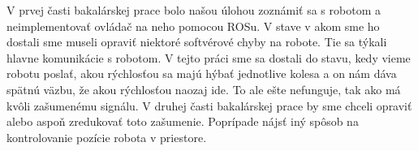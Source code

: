 
V prvej časti bakalárskej prace bolo našou úlohou zoznámiť sa s robotom a neimplementovať ovládač na neho pomocou ROSu.
V stave v akom sme ho dostali sme museli opraviť niektoré softvérové chyby na robote. Tie sa týkali hlavne komunikácie s robotom.
V tejto práci sme sa dostali do stavu, kedy vieme robotu poslať, akou rýchlosťou sa majú hýbať jednotlive kolesa a on nám dáva spätnú väzbu,
že akou rýchlosťou naozaj ide. To ale ešte nefunguje, tak ako má kvôli zašumenému signálu. V druhej časti bakalárskej prace by sme chceli opraviť
alebo aspoň zredukovať toto zašumenie. Poprípade nájsť iný spôsob na kontrolovanie pozície robota v priestore.

